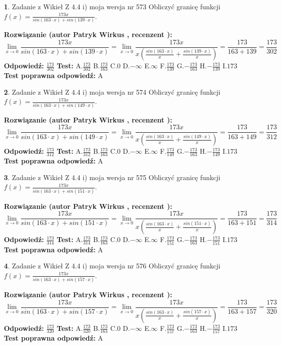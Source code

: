 \documentclass[12pt, a4paper]{article}
\theoremstyle{definition} %
\newtheorem{zad}{}
\newcommand{\zadStart}[1]{\begin{zad}#1\newline}
\newcommand{\zadStop}{\end{zad}}
\newcommand{\rozwStart}[2]{\noindent \textbf{Rozwiązanie (autor #1 , recenzent #2): }\newline}
\newcommand{\rozwStop}{\newline}
\newcommand{\odpStart}{\noindent \textbf{Odpowiedź:}\newline}
\newcommand{\odpStop}{\newline}
\newcommand{\testStart}{\noindent \textbf{Test:}\newline}
\newcommand{\testStop}{\newline}
\newcommand{\kluczStart}{\noindent \textbf{Test poprawna odpowiedź:}\newline}
\newcommand{\kluczStop}{\newline}
\begin{document}
\zadStart{Zadanie z Wikieł Z 4.4 i) moja wersja nr 573}
Obliczyć granicę funkcji $f(x)=\frac{173x}{sin(163\cdot x) +sin(139\cdot x)}$.
\zadStop
\rozwStart{Patryk Wirkus}{}
$$\lim\limits_{x\to 0}\frac{173x}{sin(163\cdot x) +sin(139\cdot x)}=\lim\limits_{x\to 0}\frac{173x}{x(\frac{sin(163\cdot x)}{x}+\frac{sin(139\cdot x)}{x})}=\frac{173}{163+139} = \frac{173}{302}$$
\rozwStop
\odpStart
$\frac{173}{302}$
\odpStop
\testStart
A.$\frac{173}{302}$
B.$\frac{173}{163}$
C.$0$
D.$-\infty$
E.$\infty$
F.$\frac{173}{139}$
G.$-\frac{173}{163}$
H.$-\frac{173}{139}$
I.$173$
\testStop
\kluczStart
A
\kluczStop



\zadStart{Zadanie z Wikieł Z 4.4 i) moja wersja nr 574}
Obliczyć granicę funkcji $f(x)=\frac{173x}{sin(163\cdot x) +sin(149\cdot x)}$.
\zadStop
\rozwStart{Patryk Wirkus}{}
$$\lim\limits_{x\to 0}\frac{173x}{sin(163\cdot x) +sin(149\cdot x)}=\lim\limits_{x\to 0}\frac{173x}{x(\frac{sin(163\cdot x)}{x}+\frac{sin(149\cdot x)}{x})}=\frac{173}{163+149} = \frac{173}{312}$$
\rozwStop
\odpStart
$\frac{173}{312}$
\odpStop
\testStart
A.$\frac{173}{312}$
B.$\frac{173}{163}$
C.$0$
D.$-\infty$
E.$\infty$
F.$\frac{173}{149}$
G.$-\frac{173}{163}$
H.$-\frac{173}{149}$
I.$173$
\testStop
\kluczStart
A
\kluczStop



\zadStart{Zadanie z Wikieł Z 4.4 i) moja wersja nr 575}
Obliczyć granicę funkcji $f(x)=\frac{173x}{sin(163\cdot x) +sin(151\cdot x)}$.
\zadStop
\rozwStart{Patryk Wirkus}{}
$$\lim\limits_{x\to 0}\frac{173x}{sin(163\cdot x) +sin(151\cdot x)}=\lim\limits_{x\to 0}\frac{173x}{x(\frac{sin(163\cdot x)}{x}+\frac{sin(151\cdot x)}{x})}=\frac{173}{163+151} = \frac{173}{314}$$
\rozwStop
\odpStart
$\frac{173}{314}$
\odpStop
\testStart
A.$\frac{173}{314}$
B.$\frac{173}{163}$
C.$0$
D.$-\infty$
E.$\infty$
F.$\frac{173}{151}$
G.$-\frac{173}{163}$
H.$-\frac{173}{151}$
I.$173$
\testStop
\kluczStart
A
\kluczStop



\zadStart{Zadanie z Wikieł Z 4.4 i) moja wersja nr 576}
Obliczyć granicę funkcji $f(x)=\frac{173x}{sin(163\cdot x) +sin(157\cdot x)}$.
\zadStop
\rozwStart{Patryk Wirkus}{}
$$\lim\limits_{x\to 0}\frac{173x}{sin(163\cdot x) +sin(157\cdot x)}=\lim\limits_{x\to 0}\frac{173x}{x(\frac{sin(163\cdot x)}{x}+\frac{sin(157\cdot x)}{x})}=\frac{173}{163+157} = \frac{173}{320}$$
\rozwStop
\odpStart
$\frac{173}{320}$
\odpStop
\testStart
A.$\frac{173}{320}$
B.$\frac{173}{163}$
C.$0$
D.$-\infty$
E.$\infty$
F.$\frac{173}{157}$
G.$-\frac{173}{163}$
H.$-\frac{173}{157}$
I.$173$
\testStop
\kluczStart
A
\kluczStop
\end{document}
